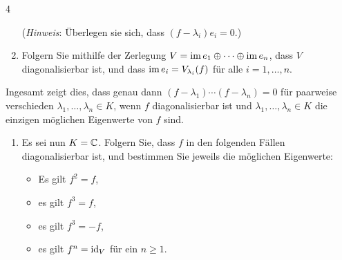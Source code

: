 \begin{question}[subtitle = Ein Kriterium für Diagonalisierbarkeit mithilfe von complete sets of orthogonal idempotents]{4}
\begin{enumerate}[resume]
      (\emph{Hinweis}:
       Überlegen sie sich, dass $(f - \lambda_i) e_i = 0$.)
    \item
      Folgern Sie mithilfe der Zerlegung $V = \operatorname{im} e_1 \oplus \dotsb \oplus \operatorname{im} e_n$, dass $V$ diagonalisierbar ist, und dass $\operatorname{im} e_i = V_{\lambda_i}(f)$ für alle $i = 1, \dotsc, n$.
  \end{enumerate}
  Ingesamt zeigt dies, dass genau dann $(f - \lambda_1) \dotsm (f - \lambda_n) = 0$ für paarweise verschieden $\lambda_1, \dotsc, \lambda_n \in K$, wenn $f$ diagonalisierbar ist und $\lambda_1, \dotsc, \lambda_n \in K$ die einzigen möglichen Eigenwerte von $f$ sind.
  \begin{enumerate}[resume]
    \item 
      Es sei nun $K = \mathbb{C}$.
      Folgern Sie, dass $f$ in den folgenden Fällen diagonalisierbar ist, und bestimmen Sie jeweils die möglichen Eigenwerte:
      \begin{itemize}
        \item
          Es gilt $f^2 = f$,
        \item
          es gilt $f^3 = f$,
        \item
          es gilt $f^3 = -f$,
        \item
          es gilt $f^n = \operatorname{id}_V$ für ein $n \geq 1$.
      \end{itemize}
  \end{enumerate}
\end{question}

